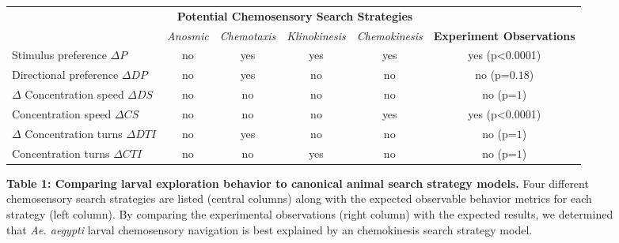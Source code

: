 \begin{figure*}[t!]
\bgroup \small {}
\begin{tabular}{ l||c|c|c|c||c } \hline
    & \multicolumn{4}{c||}{\textbf{Potential Chemosensory Search Strategies}} & \\
     &\textit{Anosmic} & 
   \textit{Chemotaxis} & 
    \textit{Klinokinesis} &
    \textit{Chemokinesis} & \textbf{Experiment Observations} \\
\hline \hline
    Stimulus preference ${\Delta P}$ & no & 
    \cellcolor{yes}yes  & \cellcolor{yes}yes  & 
    \cellcolor{yes}yes  &\cellcolor{expyes}yes (p<0.0001)\\ 
\hline
    Directional preference ${\Delta DP}$ & no  & 
    \cellcolor{yes}yes  & no  & 
    no  & no (p=${0.18}$) \\  
\hline
    ${\Delta}$ Concentration speed ${\Delta DS}$ &  no  & 
     no   &  no  & 
     no  & no (p=${1}$) \\ 
\hline
    Concentration speed ${\Delta CS}$ & no  & 
    no & no  & 
    \cellcolor{yes}yes  &\cellcolor{expyes}yes (p<0.0001) \\ 
\hline
    ${\Delta}$ Concentration turns ${\Delta DTI}$ &  no  & 
    \cellcolor{yes}yes   &  no  & 
     no & no (p=${1}$)\\ 
\hline
    Concentration turns ${\Delta CTI}$ &  no  & 
     no & \cellcolor{yes}yes  & 
     no &  no (p=${1}$) \\ 
\hline \end{tabular} \egroup
\caption*{\textbf{Table 1: Comparing larval exploration behavior to canonical animal search strategy models.} Four different chemosensory search strategies are listed (central columns) along with the expected observable behavior metrics for each strategy (left column). By comparing the experimental observations (right column) with the expected results, we determined that \textit{Ae. aegypti} larval chemosensory navigation is best explained by an chemokinesis search strategy model.
}
\end{figure*}